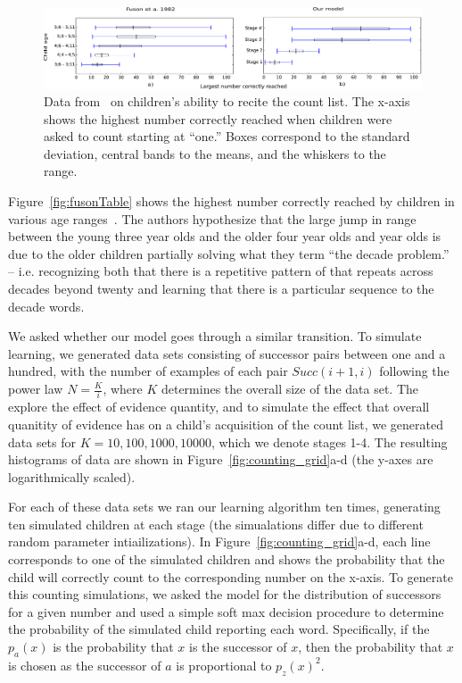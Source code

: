 \documentclass[10pt,letterpaper]{article}
\begin{document}
\begin{figure}[t]
\includegraphics[width=0.9\linewidth]{figures/modelboxplot}
\caption{Data from~\citet{FusRicBriar1982} on children's ability to
  recite the count list. The x-axis shows the highest number correctly
  reached when children were asked to count starting at ``one.'' Boxes
  correspond to the standard deviation, central bands to the means,
  and the whiskers to the range.
\label{fig:fuson_count_data}}
\end{figure}

Figure~\ref{fig:fusonTable} shows the highest number correctly reached
by children in various age ranges~\cite{FusRicBriar1982}. The authors
hypothesize that the large jump in range between the young three year
olds and the older four year olds and year olds is due to the older
children partially solving what they term ``the decade problem.'' --
i.e. recognizing both that there is a repetitive pattern of that
repeats across decades beyond twenty and learning that there is a
particular sequence to the decade words.

We asked whether our model goes through a similar transition. To
simulate learning, we generated data sets consisting of successor
pairs between one and a hundred, with the number of examples of each
pair $Succ(i+1, i)$ following the power law $N=\frac{K}{i}$, where $K$
determines the overall size of the data set. The explore the effect of
evidence quantity, and to simulate the effect that overall quanitity
of evidence has on a child's acquisition of the count list, we
generated data sets for $K=10, 100, 1000, 10000$, which we denote
stages 1-4. The resulting histograms of data are shown in
Figure~\ref{fig:counting_grid}a-d (the y-axes are logarithmically
scaled).

For each of these data sets we ran our learning algorithm ten times,
generating ten simulated children at each stage (the simualations
differ due to different random parameter intiailizations). In
Figure~\ref{fig:counting_grid}a-d, each line corresponds to one of the
simulated children and shows the probability that the child will
correctly count to the corresponding number on the x-axis. To generate
this counting simulations, we asked the model for the distribution of
successors for a given number and used a simple soft max decision
procedure to determine the probability of the simulated child
reporting each word. Specifically, if the $p_a(x)$ is the probability
that $x$ is the successor of $x$, then the probability that $x$ is
chosen as the successor of $a$ is proportional to $p_z(x)^2$.
\end{document}
